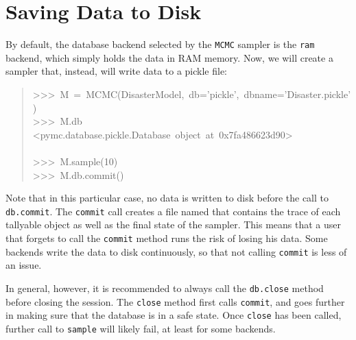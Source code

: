 
\hypertarget{saving-data-to-disk}{}
\section*{Saving Data to Disk}

By default, the database backend selected by the \texttt{MCMC} sampler is the \texttt{ram}
backend, which simply holds the data in RAM memory. Now, we will create a 
sampler that, instead, will write data to a pickle file:
\begin{quote}{\ttfamily \raggedright \noindent
>{}>{}>~M~=~MCMC(DisasterModel,~db='pickle',~dbname='Disaster.pickle')~\\
>{}>{}>~M.db~\\
<pymc.database.pickle.Database~object~at~0x7fa486623d90>~\\
~\\
>{}>{}>~M.sample(10)~\\
>{}>{}>~M.db.commit()
}\end{quote}

Note that in this particular case, no data is written to disk before the call
to \texttt{db.commit}. The \texttt{commit} call creates a file named  
that contains the trace of each tallyable object as well as the final state of 
the sampler. This means that a user that forgets to call the \texttt{commit} 
method runs the risk of losing his data. Some backends write the data to disk
continuously, so that not calling \texttt{commit} is less of an issue.

In general, however, it is recommended to always call the \texttt{db.close} method 
before closing the session. The \texttt{close} method first calls \texttt{commit}, and 
goes further in making sure that the database is in a safe state. Once \texttt{close}
has been called, further call to \texttt{sample} will likely fail, at least 
for some backends.
\begin{center}\begin{sffamily}
\end{sffamily}
\end{center}


